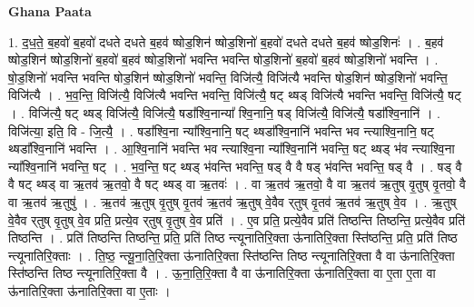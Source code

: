 \documentclass[17pt]{extarticle}
\begin{document}
\textbf{Ghana Paata } \newline

1. द॒ध॒ते॒ ब॒हवो॑ ब॒हवो॑ दधते दधते ब॒हव॑ ष्षोड॒शिन॑ ष्षोड॒शिनो॑ ब॒हवो॑ दधते दधते ब॒हव॑ ष्षोड॒शिनः॑ । . ब॒हव॑ ष्षोड॒शिन॑ ष्षोड॒शिनो॑ ब॒हवो॑ ब॒हव॑ ष्षोड॒शिनो॑ भवन्ति भवन्ति षोड॒शिनो॑ ब॒हवो॑ ब॒हव॑ ष्षोड॒शिनो॑ भवन्ति । . षो॒ड॒शिनो॑ भवन्ति भवन्ति षोड॒शिन॑ ष्षोड॒शिनो॑ भवन्ति॒ विजि॑त्यै॒ विजि॑त्यै भवन्ति षोड॒शिन॑ ष्षोड॒शिनो॑ भवन्ति॒ विजि॑त्यै । . भ॒व॒न्ति॒ विजि॑त्यै॒ विजि॑त्यै भवन्ति भवन्ति॒ विजि॑त्यै॒ षट् थ्षड् विजि॑त्यै भवन्ति भवन्ति॒ विजि॑त्यै॒ षट् । . विजि॑त्यै॒ षट् थ्षड् विजि॑त्यै॒ विजि॑त्यै॒ षडा᳚श्वि॒नान्या᳚ श्वि॒नानि॒ षड् विजि॑त्यै॒ विजि॑त्यै॒ षडा᳚श्वि॒नानि॑ । . विजि॑त्या॒ इति॒ वि - जि॒त्यै॒ । . षडा᳚श्वि॒ना न्या᳚श्वि॒नानि॒ षट् थ्षडा᳚श्वि॒नानि॑ भवन्ति भव न्त्याश्वि॒नानि॒ षट् 
थ्षडा᳚श्वि॒नानि॑ भवन्ति । . आ॒श्वि॒नानि॑ भवन्ति भव न्त्याश्वि॒ना न्या᳚श्वि॒नानि॑ भवन्ति॒ षट् थ्षड् भ॑व न्त्याश्वि॒ना न्या᳚श्वि॒नानि॑ भवन्ति॒ षट् । . भ॒व॒न्ति॒ षट् थ्षड् भ॑वन्ति भवन्ति॒ षड् वै वै षड् भ॑वन्ति भवन्ति॒ षड् वै । . षड् वै वै षट् थ्षड् वा ऋ॒तव॑ ऋ॒तवो॒ वै षट् थ्षड् वा ऋ॒तवः॑ । . वा ऋ॒तव॑ ऋ॒तवो॒ वै वा ऋ॒तव॑ ऋ॒तुष् वृ॒तुष् वृ॒तवो॒ वै वा ऋ॒तव॑ ऋ॒तुषु॑ । . ऋ॒तव॑ ऋ॒तुष् वृ॒तुष् वृ॒तव॑ ऋ॒तव॑ ऋ॒तुष् वे॒वैव र्‌तुष् वृ॒तव॑ ऋ॒तव॑ ऋ॒तुष् वे॒व । . ऋ॒तुष् वे॒वैव र्‌तुष् वृ॒तुष् वे॒व प्रति॒ प्रत्ये॒व र्‌तुष् वृ॒तुष् वे॒व प्रति॑ । . ए॒व प्रति॒ प्रत्ये॒वैव प्रति॑ तिष्ठन्ति तिष्ठन्ति॒ प्रत्ये॒वैव प्रति॑ तिष्ठन्ति । . प्रति॑ तिष्ठन्ति तिष्ठन्ति॒ प्रति॒ प्रति॑ तिष्ठ न्त्यूनातिरि॒क्ता ऊ॑नातिरि॒क्ता स्ति॑ष्ठन्ति॒ प्रति॒ प्रति॑ तिष्ठ न्त्यूनातिरि॒क्ताः । . ति॒ष्ठ॒ न्त्यू॒ना॒ति॒रि॒क्ता ऊ॑नातिरि॒क्ता स्ति॑ष्ठन्ति तिष्ठ न्त्यूनातिरि॒क्ता वै वा ऊ॑नातिरि॒क्ता स्ति॑ष्ठन्ति तिष्ठ न्त्यूनातिरि॒क्ता वै । . ऊ॒ना॒ति॒रि॒क्ता वै वा ऊ॑नातिरि॒क्ता ऊ॑नातिरि॒क्ता वा ए॒ता ए॒ता वा ऊ॑नातिरि॒क्ता ऊ॑नातिरि॒क्ता वा ए॒ताः । \newline
\end{document}
